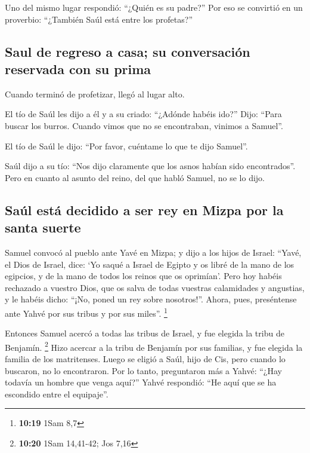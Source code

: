 \begin{paracol}{2}
 Uno del mismo lugar respondió: ``¿Quién es su padre?''
Por eso se convirtió en un proverbio: ``¿También Saúl está entre los
profetas?''

\hypertarget{saul-de-regreso-a-casa-su-conversaciuxf3n-reservada-con-su-prima}{%
\subsection{Saul de regreso a casa; su conversación reservada con su
prima}\label{saul-de-regreso-a-casa-su-conversaciuxf3n-reservada-con-su-prima}}

 Cuando terminó de profetizar, llegó al lugar alto.

 El tío de Saúl les dijo a él y a su criado: ``¿Adónde
habéis ido?'' Dijo: ``Para buscar los burros. Cuando vimos que no se
encontraban, vinimos a Samuel''.

 El tío de Saúl le dijo: ``Por favor, cuéntame lo que te
dijo Samuel''.

 Saúl dijo a su tío: ``Nos dijo claramente que los asnos
habían sido encontrados''. Pero en cuanto al asunto del reino, del que
habló Samuel, no se lo dijo.

\hypertarget{sauxfal-estuxe1-decidido-a-ser-rey-en-mizpa-por-la-santa-suerte}{%
\subsection{Saúl está decidido a ser rey en Mizpa por la santa
suerte}\label{sauxfal-estuxe1-decidido-a-ser-rey-en-mizpa-por-la-santa-suerte}}

 Samuel convocó al pueblo ante Yavé en Mizpa;
 y dijo a los hijos de Israel: ``Yavé, el Dios de Israel,
dice: `Yo saqué a Israel de Egipto y os libré de la mano de los
egipcios, y de la mano de todos los reinos que os oprimían'.
 Pero hoy habéis rechazado a vuestro Dios, que os salva
de todas vuestras calamidades y angustias, y le habéis dicho: ``¡No,
poned un rey sobre nosotros!''. Ahora, pues, preséntense ante Yahvé por
sus tribus y por sus miles''. \footnote{\textbf{10:19} 1Sam 8,7}

 Entonces Samuel acercó a todas las tribus de Israel, y
fue elegida la tribu de Benjamín. \footnote{\textbf{10:20} 1Sam
  14,41-42; Jos 7,16}  Hizo acercar a la tribu de
Benjamín por sus familias, y fue elegida la familia de los matritenses.
Luego se eligió a Saúl, hijo de Cis, pero cuando lo buscaron, no lo
encontraron.  Por lo tanto, preguntaron más a Yahvé:
``¿Hay todavía un hombre que venga aquí?'' Yahvé respondió: ``He aquí
que se ha escondido entre el equipaje''.


\end{paracol}
